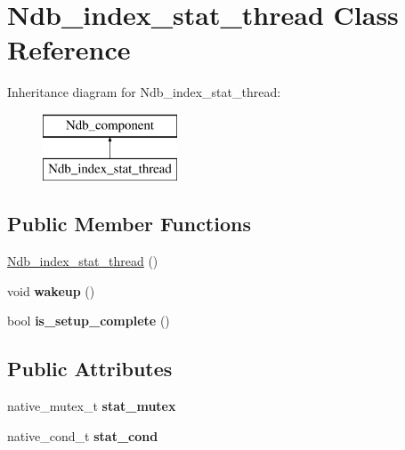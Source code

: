 \hypertarget{classNdb__index__stat__thread}{}\section{Ndb\+\_\+index\+\_\+stat\+\_\+thread Class Reference}
\label{classNdb__index__stat__thread}
Inheritance diagram for Ndb\+\_\+index\+\_\+stat\+\_\+thread\+:\begin{figure}[H]
\begin{center}
\leavevmode
\includegraphics[height=2.000000cm]{classNdb__index__stat__thread}
\end{center}
\end{figure}
\subsection*{Public Member Functions}
\begin{DoxyCompactItemize}
\item 
\mbox{\hyperlink{classNdb__index__stat__thread_a1990049af05cd9ffa1c75526ac20bbb4}{Ndb\+\_\+index\+\_\+stat\+\_\+thread}} ()
\item 
\mbox{\label{classNdb__index__stat__thread_ace645c15ffc2691d5bbafbcad0b7706b}} 
void {\bfseries wakeup} ()
\item 
\mbox{\label{classNdb__index__stat__thread_a7e12027d321bc9b0eb3057ddbb72c6b0}} 
bool {\bfseries is\+\_\+setup\+\_\+complete} ()
\end{DoxyCompactItemize}
\subsection*{Public Attributes}
\begin{DoxyCompactItemize}
\item 
\mbox{\label{classNdb__index__stat__thread_a29aa892c8d0f5281bae7b242ea41e4d6}} 
native\+\_\+mutex\+\_\+t {\bfseries stat\+\_\+mutex}
\item 
\mbox{\label{classNdb__index__stat__thread_a2b68259d29b550cc471a1603639a43a7}} 
native\+\_\+cond\+\_\+t {\bfseries stat\+\_\+cond}
\end{DoxyCompactItemize}
